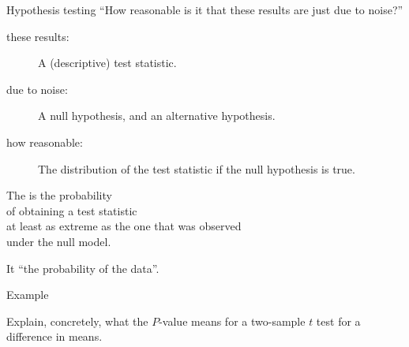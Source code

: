 \begin{frame}{Hypothesis testing}
    \alert{``How reasonable is it that these results are just due to noise?''}

    \begin{description}
        \item[these results:] A (descriptive) test statistic.  
        \item[due to noise:] A null hypothesis, and an alternative hypothesis.
        \item[how reasonable:] The distribution of the test statistic if the null hypothesis is true. 
    \end{description}

    \vspace{2em}
    \pause

    The  is the probability \\
    of obtaining a test statistic \\
    at least as extreme as the one that was observed\\
    under the null model.

    \vspace{2em}
    \pause

    It  ``the probability of the data''.

\end{frame}

\begin{frame}{Example}

    Explain, concretely, what the $P$-value means for a two-sample $t$ test
    for a difference in means.

\end{frame}

